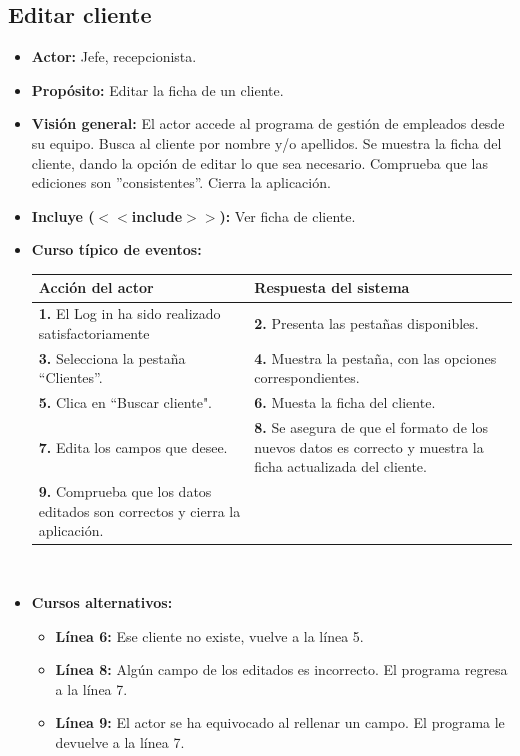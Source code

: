 \documentclass[spanish,a4paper,11pt, twoside]{report}	%
\begin{document}
	\subsection{Editar cliente}		
			\begin{itemize}
			\item \textbf{Actor:} Jefe, recepcionista.
			\item \textbf{Propósito:} Editar la ficha de un cliente.
			\item \textbf{Visión general:} El actor accede al programa de gestión de empleados desde su equipo. Busca al cliente por nombre y/o apellidos. Se muestra la ficha del cliente, dando la opción de editar lo que sea necesario. Comprueba que las ediciones son ''consistentes''. Cierra la aplicación. 
			\item \textbf{Incluye ($<<$include$>>$):} Ver ficha de cliente.
			\item \textbf{Curso típico de eventos:} 	\\
				\begin{tabular}{|p{6cm}||p{6cm}|}
				\hline
				\textbf{Acción del actor} & \textbf{Respuesta del sistema} \\ \hline \hline
				\textbf{1.} El Log in ha sido realizado satisfactoriamente & \textbf{2.} Presenta las pestañas disponibles.\\ \hline 
				\textbf{3.} Selecciona la pestaña “Clientes”. & \textbf{4.} Muestra la pestaña, con las opciones correspondientes. \\ \hline
				\textbf{5.} Clica en “Buscar cliente".	& \textbf{6.} Muesta la ficha del cliente. \\ \hline
				\textbf{7.} Edita los campos que desee. & \textbf{8.} Se asegura de que el formato de los nuevos datos es correcto y muestra la ficha actualizada del cliente.\\ \hline
				\textbf{9.} Comprueba que los datos editados son correctos y cierra la aplicación. & \textbf{} \\ \hline
				\end{tabular}
			\\
			\item \textbf{Cursos alternativos:} 
			\begin{itemize}
			\item  \textbf{Línea 6:} Ese cliente no existe, vuelve a la línea 5.
			\item  \textbf{Línea 8:} Algún campo de los editados es incorrecto. El programa regresa a la línea 7.
			\item  \textbf{Línea 9:} El actor se ha equivocado al rellenar un campo. El programa le devuelve a la línea 7.
			\end {itemize}
		\end{itemize}
\end{document}
